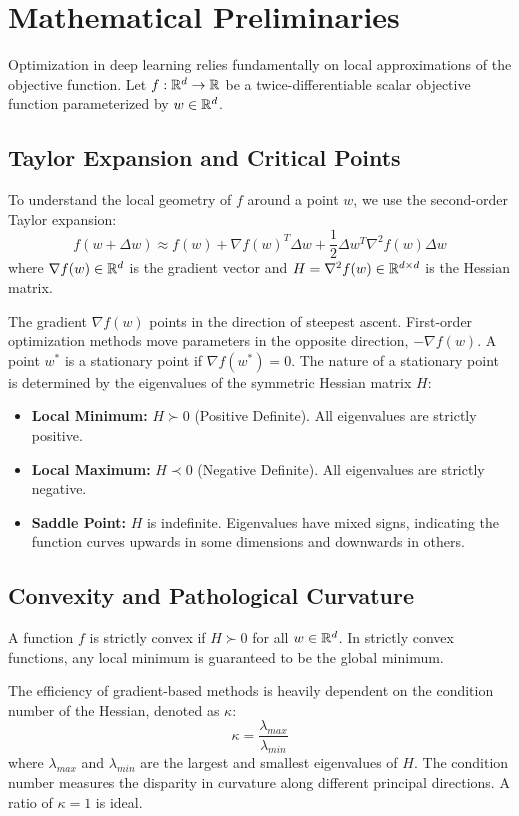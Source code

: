 \section{Mathematical Preliminaries}
\label{sec:preliminaries}

Optimization in deep learning relies fundamentally on local approximations of the objective function. Let $f: \mathbb R^d \to \mathbb R$ be a twice-differentiable scalar objective function parameterized by $w \in \mathbb R^d$.

\subsection{Taylor Expansion and Critical Points}
To understand the local geometry of $f$ around a point $w$, we use the second-order Taylor expansion:
\begin{equation}
f(w + \Delta w) \approx f(w) + \nabla f(w)^T \Delta w + \frac{1}{2} \Delta w^T \nabla^2 f(w) \Delta w
\end{equation}
where $\nabla f(w) \in \mathbb R^d$ is the gradient vector and $H = \nabla^2 f(w) \in \mathbb R^{d \times d}$ is the Hessian matrix.

The gradient $\nabla f(w)$ points in the direction of steepest ascent. First-order optimization methods move parameters in the opposite direction, $-\nabla f(w)$. A point $w^*$ is a stationary point if $\nabla f(w^*) = 0$. The nature of a stationary point is determined by the eigenvalues of the symmetric Hessian matrix $H$:
\begin{itemize}
    \item \textbf{Local Minimum:} $H \succ 0$ (Positive Definite). All eigenvalues are strictly positive.
    \item \textbf{Local Maximum:} $H \prec 0$ (Negative Definite). All eigenvalues are strictly negative.
    \item \textbf{Saddle Point:} $H$ is indefinite. Eigenvalues have mixed signs, indicating the function curves upwards in some dimensions and downwards in others.
\end{itemize}

\subsection{Convexity and Pathological Curvature}
A function $f$ is strictly convex if $H \succ 0$ for all $w \in \mathbb R^d$. In strictly convex functions, any local minimum is guaranteed to be the global minimum. 

The efficiency of gradient-based methods is heavily dependent on the condition number of the Hessian, denoted as $\kappa$:
\begin{equation}
\kappa = \frac{\lambda_{max}}{\lambda_{min}}
\end{equation}
where $\lambda_{max}$ and $\lambda_{min}$ are the largest and smallest eigenvalues of $H$. The condition number measures the disparity in curvature along different principal directions. A ratio of $\kappa = 1$ is ideal.

